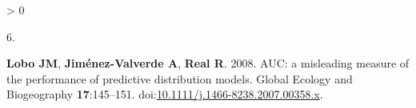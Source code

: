 \documentclass[
]{article}
\newlength{\cslhangindent}
\newlength{\csllabelwidth}
\newenvironment{CSLReferences}[2] %
 {%
  \setlength{\parindent}{0pt}
  \ifodd #1 \everypar{\setlength{\hangindent}{\cslhangindent}}\ignorespaces\fi
  \ifnum #2 > 0
  \setlength{\parskip}{#2\baselineskip}
  \fi
 }%
 {}
\newcommand{\CSLLeftMargin}[1]{\parbox[t]{\csllabelwidth}{#1}}
\newcommand{\CSLRightInline}[1]{\parbox[t]{\linewidth - \csllabelwidth}{#1}\break}
\begin{document}
\begin{CSLReferences}{0}{1}
\leavevmode\hypertarget{ref-lobo2008}{}%
\CSLLeftMargin{6. }
\CSLRightInline{\textbf{Lobo JM}, \textbf{Jiménez-Valverde A},
\textbf{Real R}. 2008. AUC: a misleading measure of the performance of
predictive distribution models. Global Ecology and Biogeography
\textbf{17}:145--151.
doi:\href{https://doi.org/10.1111/j.1466-8238.2007.00358.x}{10.1111/j.1466-8238.2007.00358.x}.}

\end{CSLReferences}
\end{document}
